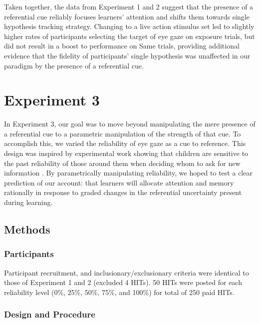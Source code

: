 \documentclass[10pt,letterpaper]{article}
\begin{document}
Taken together, the data from Experiment 1 and 2 suggest that the presence of a referential cue reliably focuses learners' attention and shifts them towards single hypothesis tracking strategy. Changing to a live action stimulus set led to slightly higher rates of participants selecting the target of eye gaze on exposure trials, but did not result in a boost to performance on Same trials, providing additional evidence that the fidelity of participants' single hypothesis was unaffected in our paradigm by the presence of a referential cue.


\section{Experiment 3}

In Experiment 3, our goal was to move beyond manipulating the mere presence of a referential cue to a parametric manipulation of the strength of that cue. To accomplish this, we varied the reliability of eye gaze as a cue to reference. This design was inspired by experimental work showing that children are sensitive to the past reliability of those around them when deciding whom to ask for new information \cite{koenig2004trust}. By parametrically manipulating reliability, we hoped to test a clear prediction of our account: that learners will allocate attention and memory rationally in response to graded changes in the referential uncertainty present during learning.

\subsection{Methods}

\subsubsection{Participants}
Participant recruitment, and inclusionary/exclusionary criteria were identical to those of Experiment 1 and 2 (excluded 4 HITs). 50 HITs were posted for each reliability level (0\%, 25\%, 50\%, 75\%, and 100\%) for total of 250 paid HITs.  

\subsubsection{Design and Procedure}
\end{document}
